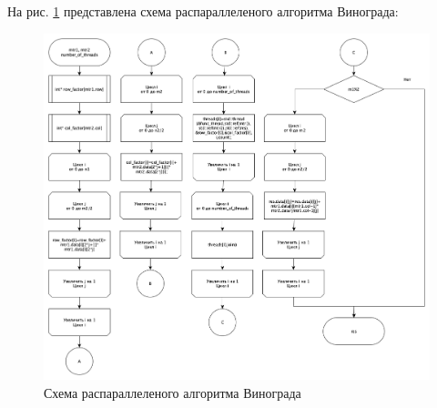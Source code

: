 \documentclass[12pt]{report}
\begin{document}
На рис. \ref{fig:def} представлена схема распараллеленого алгоритма Винограда:
	\begin{figure}[h]
        	\begin{center}
        		\includegraphics[scale=0.32]{parallel_vinograd2}
        		\caption{Схема распараллеленого алгоритма Винограда}
        		\label{fig:def}
        	\end{center}
        \end{figure}
        
\end{document}
